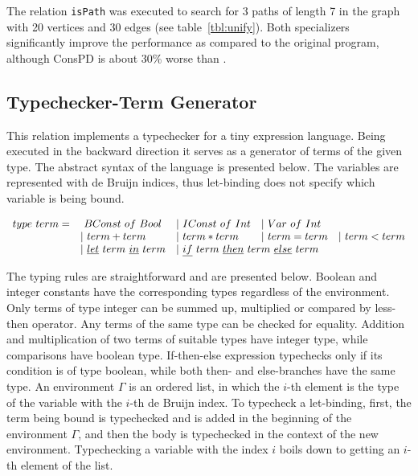 The relation \lstinline{isPath} was executed to search for 3 paths of length 7 in the graph with 20 vertices and 30 edges (see table~\ref{tbl:unify}).
Both specializers significantly improve the performance as compared to the original program, although ConsPD is about 30\% worse than \ecce.


\subsection{Typechecker-Term Generator}

This relation implements a typechecker for a tiny expression language.
Being executed in the backward direction it serves as a generator of terms of the given type.
The abstract syntax of the language is presented below.
The variables are represented with de Bruijn indices, thus let-binding does not specify which variable is being bound.



\[\begin{array}{lllll}
  type \ term = &\ BConst \ of \ Bool &| \ IConst \ of \ Int &| \ Var \ of \ Int & \\
  & | \ term + term &| \ term * term &| \ term = term &| \ term < term \\
  &| \ \underline{let} \ term \ \underline{in} \ term
  &\multicolumn{2}{l}{| \ \underline{if} \ term \ \underline{then} \ term \ \underline{else} \ term} &
\end{array}\]

The typing rules are straightforward and are presented below.
Boolean and integer constants have the corresponding types regardless of the environment.
Only terms of type integer can be summed up, multiplied or compared by less-then operator.
Any terms of the same type can be checked for equality.
Addition and multiplication of two terms of suitable types have integer type, while comparisons have boolean type.
If-then-else expression typechecks only if its condition is of type boolean, while both then- and else-branches have the same type.
An environment $\Gamma$ is an ordered list, in which the $i$-th element is the type of the variable with the $i$-th de Bruijn index.
To typecheck a let-binding, first, the term being bound is typechecked and is added in the beginning of the environment $\Gamma$, and then the body is typechecked in the context of the new environment.
Typechecking a variable with the index $i$ boils down to getting an $i$-th element of the list.

